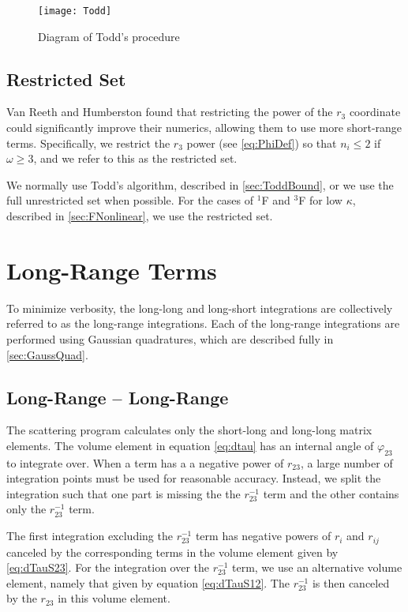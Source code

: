 \documentclass[Dissertation.tex]{subfiles}
\begin{document}
\begin{figure}[H]
	\centering
	{\texttt{[image: Todd]}}
	\caption{Diagram of Todd's procedure}
	\label{fig:Todd}
\end{figure}



\subsection{Restricted Set}
\label{sec:Restricted}
Van Reeth and Humberston \cite{VanReeth2003} found that restricting the power 
of the $r_3$ coordinate could significantly improve their numerics, allowing 
them to use more short-range terms. Specifically, we restrict the $r_3$ power 
(see \cref{eq:PhiDef}) so that $n_i \leq 2$ if $\omega \geq 3$, and we refer 
to this as the restricted set.

We normally use Todd's algorithm, described in \cref{sec:ToddBound}, or we 
use the full unrestricted set when possible. For the cases of $^1$F and $^3$F 
for low $\kappa$, described in \cref{sec:FNonlinear}, we use the restricted 
set.


\section{Long-Range Terms}
\label{sec:CompLong}

To minimize verbosity, the long-long and long-short integrations are 
collectively referred to as the long-range integrations. Each of the
long-range integrations are performed using Gaussian quadratures, which
are described fully in \cref{sec:GaussQuad}. 


\subsection{Long-Range -- Long-Range}
\label{sec:LongLongInt}

The scattering program calculates only the short-long and long-long matrix 
elements. The volume element in equation \ref{eq:dtau} has an internal angle 
of $\varphi_{23}$ to integrate over.  When a term has a a negative power of
$r_{23}$, a large number of integration points must be used for reasonable 
accuracy. Instead, we split the integration such that one part is missing the 
the $r_{23}^{-1}$ term and the other contains only the $r_{23}^{-1}$ term.

The first integration excluding the $r_{23}^{-1}$ term has negative powers of 
$r_i$ and $r_{ij}$ canceled by the corresponding terms in the volume element 
given by \cref{eq:dTauS23}. For the integration over the $r_{23}^{-1}$ term, 
we use an alternative volume element, namely that given by equation
\cref{eq:dTauS12}.
The $r_{23}^{-1}$ is then canceled by the $r_{23}$ in this volume element.
\end{document}
